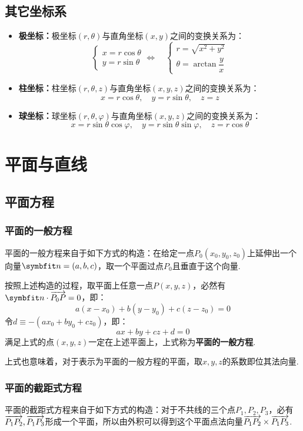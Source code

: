 \subsection{其它坐标系}
\begin{itemize}
    \item \textbf{极坐标：}极坐标$(r,\theta)$与直角坐标$(x,y)$之间的变换关系为：
    \[\begin{cases}
        x = r\cos\theta \\
        y = r\sin\theta
    \end{cases} \Leftrightarrow\quad \begin{cases}
        r = \sqrt{x^2 + y^2} \\
        \theta = \arctan\dfrac{y}{x}
    \end{cases}\]
    \item \textbf{柱坐标：}柱坐标$(r,\theta,z)$与直角坐标$(x,y,z)$之间的变换关系为：
    \[x = r\cos\theta,\quad y = r\sin\theta,\quad z = z\]
    \item \textbf{球坐标：}球坐标$(r,\theta,\varphi)$与直角坐标$(x,y,z)$之间的变换关系为：
    \[x = r\sin\theta\cos\varphi,\quad y = r\sin\theta\sin\varphi,\quad z = r\cos\theta\]
\end{itemize}


\section{平面与直线}
\subsection{平面方程}
\subsubsection{平面的一般方程}
平面的一般方程来自于如下方式的构造：在给定一点$P_0(x_0,y_0,z_0)$上延伸出一个向量$\vb{n} = (a,b,c)$，取一个平面过点$P_0$且垂直于这个向量.

按照上述构造的过程，取平面上任意一点$P(x,y,z)$，必然有$\vb{n}\cdot\va{P_0P} = 0$，即：
\[a(x-x_0) + b(y-y_0) + c(z-z_0) = 0\]
令$d \equiv -(ax_0 + by_0 + cz_0)$，即：
\[ax + by + cz + d = 0\]
满足上式的点$(x,y,z)$一定在上述平面上，上式称为\textbf{平面的一般方程}.

上式也意味着，对于表示为平面的一般方程的平面，取$x,y,z$的系数即位其法向量.


\subsubsection{平面的截距式方程}
平面的截距式方程来自于如下方式的构造：对于不共线的三个点$P_1,P_2,P_3$，必有$\overrightarrow{P_1P_2},\overrightarrow{P_1P_3}$形成一个平面，所以由外积可以得到这个平面点法向量$\overrightarrow{P_1P_2}\times\overrightarrow{P_1P_3}$.

